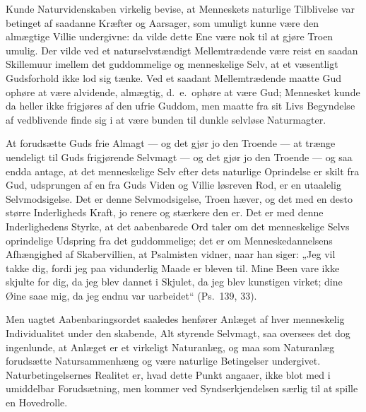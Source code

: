 \documentclass[12pt]{book}
\begin{document}
Kunde Naturvidenskaben virkelig bevise, at Menneskets naturlige
Tilblivelse var betinget af saadanne Kræfter og Aarsager, som umuligt
kunne være den almægtige Villie undergivne: da vilde dette Ene være
nok til at gjøre Troen umulig. Der vilde ved et naturselvstændigt
Mellemtrædende være reist en saadan Skillemuur imellem det
guddommelige og menneskelige Selv, at et væsentligt Gudsforhold ikke
lod sig tænke. Ved et saadant Mellemtrædende maatte Gud ophøre at
være alvidende, almægtig, d.\ e.\ ophøre at være Gud; Mennesket
kunde da heller ikke frigjøres af den ufrie Guddom, men maatte fra
sit Livs Begyndelse af vedblivende finde sig i at være bunden til
dunkle selvløse Naturmagter.

At forudsætte Guds frie Almagt --- og det gjør jo den Troende ---
at trænge uendeligt til Guds frigjørende Selvmagt --- og det gjør jo
den Troende --- og saa endda antage, at det menneskelige Selv efter
dets naturlige Oprindelse er skilt fra Gud, udsprungen af en fra
Guds Viden og Villie løsreven Rod, er en utaalelig Selvmodsigelse.
Det er denne Selvmodsigelse, Troen hæver, og det med en desto større
Inderligheds Kraft, jo renere og stærkere den er. Det er med denne
Inderlighedens
Styrke, at det aabenbarede Ord taler om det menneskelige Selvs
oprindelige Udspring fra det guddommelige; det er om
Menneskedannelsens Afhængighed af Skabervillien, at Psalmisten
vidner, naar han siger: „Jeg vil takke dig, fordi jeg paa vidunderlig
Maade er bleven til. Mine Been vare ikke skjulte for dig, da jeg
blev dannet i Skjulet, da jeg blev kunstigen virket; dine Øine saae
mig, da jeg endnu var uarbeidet“ (Ps.\ 139, 33).

Men uagtet Aabenbaringsordet saaledes henfører Anlæget af hver
menneskelig Individualitet under den skabende, Alt styrende
Selvmagt, saa oversees det dog ingenlunde, at Anlæget er et
virkeligt Naturanlæg, og maa som Naturanlæg forudsætte
Natursammenhæng og være naturlige Betingelser undergivet.
Naturbetingelsernes Realitet er, hvad dette Punkt angaaer, ikke blot
med i umiddelbar Forudsætning, men kommer ved Syndserkjendelsen
særlig til at spille en Hovedrolle.
\end{document}
